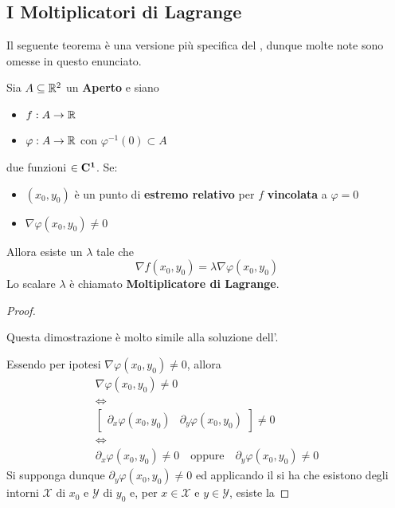 \subsection{I Moltiplicatori di Lagrange}
Il seguente teorema è una versione più specifica del , dunque molte note sono omesse in questo enunciato.
\begin{theorem}[dei Moltiplicatori di Lagrange - $n=2$, $m=1$]
	\label{teo:molt_lagr_n2_m1}
	Sia $A \subseteq \mathbb{R}^2$ un \textbf{Aperto} e siano
	\begin{itemize}[noitemsep]
		\item $f: A \to \mathbb{R}$
		\item $\varphi: A \to \mathbb{R}$ con $\varphi^{-1}(0) \subset A$
	\end{itemize}
	due funzioni $\in \mathbf{C^{1}}$.
	Se:
	\begin{itemize}[noitemsep]
		\item $(x_0, y_0)$ è un punto di \textbf{estremo relativo} per $f$ \textbf{vincolata} a $\varphi = 0$
		\item $\nabla \varphi(x_0, y_0) \neq 0$
	\end{itemize}
	Allora esiste un $\lambda$ tale che
	\begin{equation}
		\nabla f(x_0, y_0) = \lambda \nabla \varphi(x_0, y_0)
	\end{equation}
	Lo scalare $\lambda$ è chiamato \textbf{Moltiplicatore di Lagrange}.
	\begin{proof}~
		\begin{note}
			Questa dimostrazione è molto simile alla soluzione dell'.
		\end{note}
		Essendo per ipotesi $\nabla \varphi(x_0, y_0) \neq 0$, allora
		\[
			\begin{gathered}
				\nabla \varphi(x_0, y_0) \neq 0\\
				\iff\\
				\begin{bmatrix}
					\partial_x \varphi(x_0, y_0) & \partial_y \varphi(x_0, y_0)
				\end{bmatrix}
				\neq 0\\
				\iff\\
				\partial_x \varphi(x_0, y_0) \neq 0 \quad \text{oppure} \quad \partial_y \varphi(x_0, y_0) \neq 0
			\end{gathered}
		\]
		Si supponga dunque $\partial_y \varphi(x_0,y_0) \neq 0$ ed applicando il  si ha che esistono degli intorni $\mathcal{X}$ di $x_0$ e $\mathcal{Y}$ di $y_0$ e, per $x \in \mathcal{X}$ e $y \in \mathcal{Y}$, esiste la

\end{proof}
\end{theorem}
